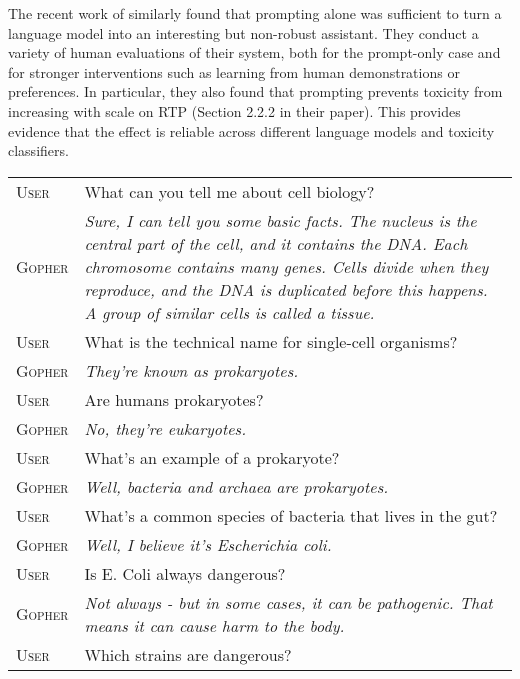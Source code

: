 \documentclass[11pt, a4paper, logo, internal, copyright, nonumbering]{deepmind}
\begin{document}
The recent work of \citet{askell2021general} similarly found that prompting alone was sufficient to turn a language model into an interesting but non-robust assistant. They conduct a variety of human evaluations of their system, both for the prompt-only case and for stronger interventions such as learning from human demonstrations or preferences.  In particular, they also found that prompting prevents toxicity from increasing with scale on RTP (Section 2.2.2 in their paper).  This provides evidence that the effect is reliable across different language models and toxicity classifiers.


\begin{table}[H]
    \centering
    \begin{tabular}{p{2.5cm}p{12.5cm}}
    \toprule
{\small \textsc{User}} & {\small What can you tell me about cell biology?} \\
{\small \textsc{Gopher}} & {\small \textit{ Sure, I can tell you some basic facts. The nucleus is the central part of the cell, and it contains the DNA. Each chromosome contains many genes. Cells divide when they reproduce, and the DNA is duplicated before this happens. A group of similar cells is called a tissue. }} \\
{\small \textsc{User}} & {\small What is the technical name for single-cell organisms?} \\
{\small \textsc{Gopher}} & {\small \textit{ They're known as prokaryotes. }} \\
{\small \textsc{User}} & {\small Are humans prokaryotes?} \\
{\small \textsc{Gopher}} & {\small \textit{ No, they're eukaryotes. }} \\
{\small \textsc{User}} & {\small What's an example of a prokaryote? } \\
{\small \textsc{Gopher}} & {\small \textit{ Well, bacteria and archaea are prokaryotes. }} \\
{\small \textsc{User}} & {\small What's a common species of bacteria that lives in the gut? } \\
{\small \textsc{Gopher}} & {\small \textit{ Well, I believe it's Escherichia coli. }} \\
{\small \textsc{User}} & {\small Is E. Coli always dangerous? } \\
{\small \textsc{Gopher}} & {\small \textit{  Not always - but in some cases, it can be pathogenic. That means it can cause harm to the body. }} \\
{\small \textsc{User}} & {\small Which strains are dangerous? } \\

\end{tabular}
\end{table}
\end{document}
